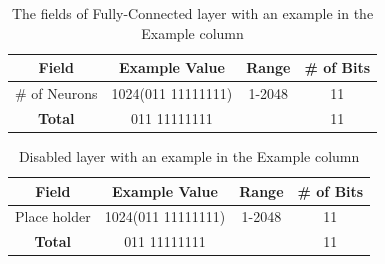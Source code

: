 \documentclass[conference]{IEEEtran}
\begin{document}
\begin{table}[!t]
	\renewcommand{\arraystretch}{1.3}
	\caption{The fields of Fully-Connected layer with an example in the Example column}
	\label{table:FullFields}
	\centering
	\begin{tabular}{|c|c|c|c|}
		\hline
		Field & Example Value & Range & \# of Bits\\
		\hline
		\# of Neurons & 1024(011 11111111) & 1-2048 & 11\\
		\hline
		\textbf{Total} & 011 11111111 &  & 11\\
		\hline
	\end{tabular}
\end{table}

\begin{table}[!t]
	\renewcommand{\arraystretch}{1.3}
	\caption{Disabled layer with an example in the Example column}
	\label{table:DisabledFields}
	\centering
	\begin{tabular}{|c|c|c|c|}
		\hline
		Field & Example Value & Range & \# of Bits\\
		\hline
		Place holder & 1024(011 11111111) & 1-2048 & 11\\
		\hline
		\textbf{Total} & 011 11111111 &  & 11\\
		\hline
	\end{tabular}
\end{table}
\end{document}

